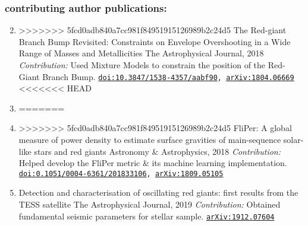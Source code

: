 \documentclass[letterpaper]{k-cv} %
\begin{document}
\begin{enumerate}
\subsubsection*{\color{c2}contributing author publications:}
\begin{enumerate}
	\setcounter{enumi}{1}
	\item {}
>>>>>>> 5fcd0adb840a7cc981f84951915126989b2c24d5
	{The Red-giant Branch Bump Revisited: Constraints on Envelope Overshooting in a Wide Range of Masses and Metallicities}
	{The Astrophysical Journal, 2018}
	{\textit{Contribution:} Used Mixture Models to constrain the position of the Red-Giant Branch Bump.}
	{\texttt{\href{https://iopscience.iop.org/article/10.3847/1538-4357/aabf90}{doi:10.3847/1538-4357/aabf90}, \href{https://arxiv.org/abs/1804.06669}{arXiv:1804.06669}}}
<<<<<<< HEAD
	
	\item {}
=======

	\item {}
>>>>>>> 5fcd0adb840a7cc981f84951915126989b2c24d5
	{FliPer: A global measure of power density to estimate surface gravities of main-sequence solar-like stars and red giants}
	{Astronomy \& Astrophysics, 2018}
	{\textit{Contribution:} Helped develop the FliPer metric \& its machine learning implementation.}
	{\texttt{\href{https://www.aanda.org/articles/aa/abs/2018/12/aa33106-18/aa33106-18.html}{doi:0.1051/0004-6361/201833106}, \href{https://arxiv.org/abs/1809.05105}{arXiv:1809.05105}}}
	
	\item {}
	{Detection and characterisation of oscillating red giants: first results from the TESS satellite}
	{The Astrophysical Journal, 2019}
	{\bodyfont \textit{Contribution:} Obtained fundamental seismic parameters for stellar sample.}
	{\texttt{\href{https://arxiv.org/abs/1912.07604}{arXiv:1912.07604}}}
		

\end{enumerate}
\end{enumerate}
\end{document}
